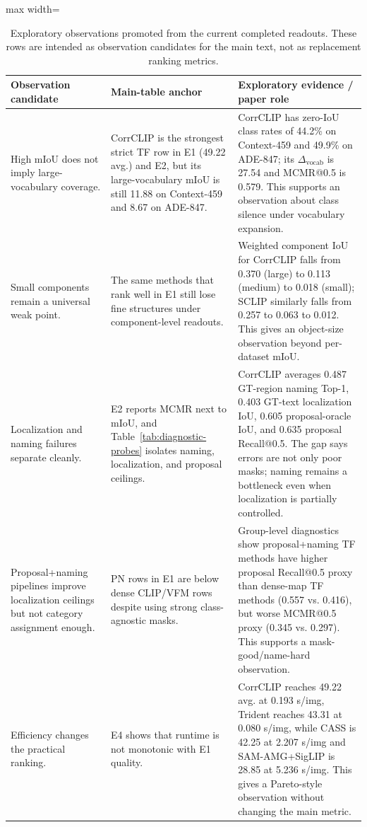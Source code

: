 \documentclass[11pt,a4paper]{article}
\begin{document}
\begin{table}[H]
\centering
\scriptsize
\caption{Exploratory observations promoted from the current completed readouts. These rows are intended as observation candidates for the main text, not as replacement ranking metrics.}
\label{tab:promoted-observations}
\setlength{\tabcolsep}{3pt}
\begin{adjustbox}{max width=\textwidth}
\begin{tabular}{p{} p{} p{}}
\toprule
Observation candidate & Main-table anchor & Exploratory evidence / paper role \\
\midrule
High mIoU does not imply large-vocabulary coverage. & CorrCLIP is the strongest strict TF row in E1 (49.22 avg.) and E2, but its large-vocabulary mIoU is still 11.88 on Context-459 and 8.67 on ADE-847. & CorrCLIP has zero-IoU class rates of 44.2\% on Context-459 and 49.9\% on ADE-847; its $\Delta_{\mathrm{vocab}}$ is 27.54 and MCMR@0.5 is 0.579. This supports an observation about class silence under vocabulary expansion. \\
Small components remain a universal weak point. & The same methods that rank well in E1 still lose fine structures under component-level readouts. & Weighted component IoU for CorrCLIP falls from 0.370 (large) to 0.113 (medium) to 0.018 (small); SCLIP similarly falls from 0.257 to 0.063 to 0.012. This gives an object-size observation beyond per-dataset mIoU. \\
Localization and naming failures separate cleanly. & E2 reports MCMR next to mIoU, and Table~\ref{tab:diagnostic-probes} isolates naming, localization, and proposal ceilings. & CorrCLIP averages 0.487 GT-region naming Top-1, 0.403 GT-text localization IoU, 0.605 proposal-oracle IoU, and 0.635 proposal Recall@0.5. The gap says errors are not only poor masks; naming remains a bottleneck even when localization is partially controlled. \\
Proposal+naming pipelines improve localization ceilings but not category assignment enough. & PN rows in E1 are below dense CLIP/VFM rows despite using strong class-agnostic masks. & Group-level diagnostics show proposal+naming TF methods have higher proposal Recall@0.5 proxy than dense-map TF methods (0.557 vs. 0.416), but worse MCMR@0.5 proxy (0.345 vs. 0.297). This supports a mask-good/name-hard observation. \\
Efficiency changes the practical ranking. & E4 shows that runtime is not monotonic with E1 quality. & CorrCLIP reaches 49.22 avg. at 0.193 s/img, Trident reaches 43.31 at 0.080 s/img, while CASS is 42.25 at 2.207 s/img and SAM-AMG+SigLIP is 28.85 at 5.236 s/img. This gives a Pareto-style observation without changing the main metric. \\
\bottomrule
\end{tabular}
\end{adjustbox}
\end{table}
\end{document}
